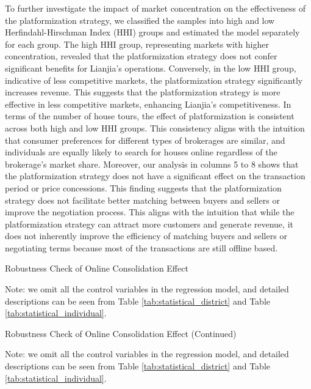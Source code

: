 \documentclass[11pt]{article}
\begin{document}
To further investigate the impact of market concentration on the effectiveness of the platformization strategy, we classified the samples into high and low Herfindahl-Hirschman Index (HHI) groups and estimated the model separately for each group. The high HHI group, representing markets with higher concentration, revealed that the platformization strategy does not confer significant benefits for Lianjia's operations. Conversely, in the low HHI group, indicative of less competitive markets, the platformization strategy significantly increases revenue. This suggests that the platformization strategy is more effective in less competitive markets, enhancing Lianjia's competitiveness. In terms of the number of house tours, the effect of platformization is consistent across both high and low HHI groups. This consistency aligns with the intuition that consumer preferences for different types of brokerages are similar, and individuals are equally likely to search for houses online regardless of the brokerage's market share. Moreover, our analysis in columns 5 to 8 shows that the platformization strategy does not have a significant effect on the transaction period or price concessions. This finding suggests that the platformization strategy does not facilitate better matching between buyers and sellers or improve the negotiation process. This aligns with the intuition that while the platformization strategy can attract more customers and generate revenue, it does not inherently improve the efficiency of matching buyers and sellers or negotiating terms because most of the transactions are still offline based.

\begin{table}
  \begin{center}
    \begin{scriptsize}
      \caption{Robustness Check of Online Consolidation Effect}
      \label{tab:heter_platform_did}
      
    
    Note: we omit all the control variables in the regression model, and detailed descriptions can be seen from Table \ref{tab:statistical_district} and Table \ref{tab:statistical_individual}.
    \end{scriptsize}
  \end{center}
\end{table}

\begin{table}
  \begin{center}
    \begin{scriptsize}
      \caption{Robustness Check of Online Consolidation Effect (Continued)}
      \label{tab:heter_platform_did}
      
    
    Note: we omit all the control variables in the regression model, and detailed descriptions can be seen from Table \ref{tab:statistical_district} and Table \ref{tab:statistical_individual}.
    \end{scriptsize}
  \end{center}
\end{table}
\end{document}
